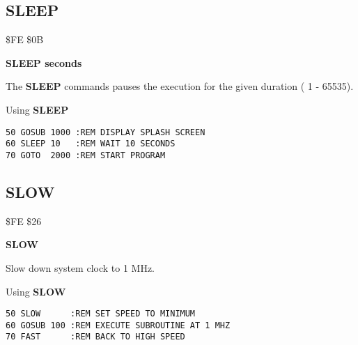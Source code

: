 
\newpage
\subsection{SLEEP}
\begin{description}[leftmargin=2cm,style=nextline]
\item [Token:] \$FE \$0B
\item [Format:] {\bf SLEEP seconds}
\item [Usage:] The {\bf SLEEP} commands pauses the execution
               for the given duration ( 1 - 65535).

\item [Example:] Using {\bf SLEEP}
\begin{tcolorbox}[colback=black,coltext=white]
\verbatimfont{\codefont}
\begin{verbatim}
50 GOSUB 1000 :REM DISPLAY SPLASH SCREEN
60 SLEEP 10   :REM WAIT 10 SECONDS
70 GOTO  2000 :REM START PROGRAM
\end{verbatim}
\end{tcolorbox}
\end{description}


\newpage
\subsection{SLOW}
\begin{description}[leftmargin=2cm,style=nextline]
\item [Token:] \$FE \$26
\item [Format:] {\bf SLOW}
\item [Usage:] Slow down system clock to 1 MHz.

\item [Example:] Using {\bf SLOW}
\begin{tcolorbox}[colback=black,coltext=white]
\verbatimfont{\codefont}
\begin{verbatim}
50 SLOW      :REM SET SPEED TO MINIMUM
60 GOSUB 100 :REM EXECUTE SUBROUTINE AT 1 MHZ
70 FAST      :REM BACK TO HIGH SPEED
\end{verbatim}
\end{tcolorbox}
\end{description}


\newpage
